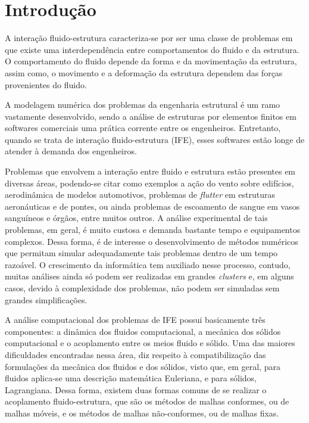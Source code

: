 \chapter[Introdução]{Introdução}\label{capitulo:introducao}

A interação fluido-estrutura caracteriza-se por ser uma classe de problemas em que existe uma interdependência entre comportamentos do fluido e da estrutura. O comportamento do fluido depende da forma e da movimentação da estrutura, assim como, o movimento e a deformação da estrutura dependem das forças provenientes do fluido.

A modelagem numérica dos problemas da engenharia estrutural é um ramo vastamente desenvolvido, sendo a análise de estruturas por elementos finitos em softwares comerciais uma prática corrente entre os engenheiros. Entretanto, quando se trata de interação fluido-estrutura (IFE), esses softwares estão longe de atender à demanda dos engenheiros.

Problemas que envolvem a interação entre fluido e estrutura estão presentes em diversas áreas, podendo-se citar como exemplos a ação do vento sobre edifícios, aerodinâmica de modelos automotivos, problemas de \textit{flutter} em estruturas aeronáuticas e de pontes, ou ainda problemas de escoamento de sangue em vasos sanguíneos e órgãos, entre muitos outros. A análise experimental de tais problemas, em geral, é muito custosa e demanda bastante tempo e equipamentos complexos. Dessa forma, é de interesse o desenvolvimento de métodos numéricos que permitam simular adequadamente tais problemas dentro de um tempo razoável. O crescimento da informática tem auxiliado nesse processo, contudo, muitas análises ainda só podem ser realizadas em grandes \textit{clusters} e, em alguns casos, devido à complexidade dos problemas, não podem ser simuladas sem grandes simplificações.

A análise computacional dos problemas de IFE possui basicamente três componentes: a dinâmica dos fluidos computacional, a mecânica dos sólidos computacional e o acoplamento entre os meios fluido e sólido. Uma das maiores dificuldades encontradas nessa área, diz respeito à compatibilização das formulações da mecânica dos fluidos e dos sólidos, visto que, em geral, para fluidos aplica-se uma descrição matemática Euleriana, e para sólidos, Lagrangiana. Dessa forma, existem duas formas comuns de se realizar o acoplamento fluido-estrutura, que são os métodos de malhas conformes, ou de malhas móveis, e os métodos de malhas não-conformes, ou de malhas fixas. 

